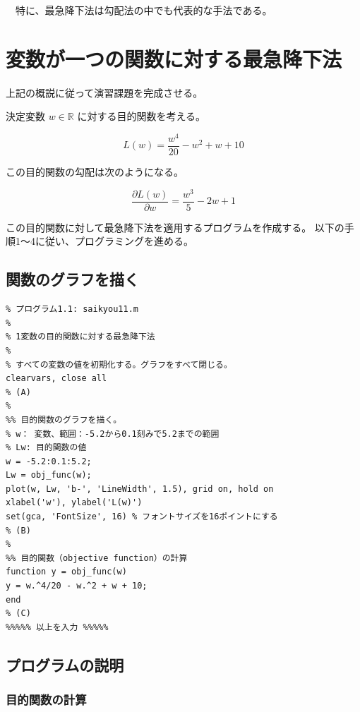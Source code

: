 \documentclass[10pt,a4paper,titlepage]{jreport} %
\begin{document}
　特に、最急降下法は勾配法の中でも代表的な手法である。

\section{変数が一つの関数に対する最急降下法}

上記の概説に従って演習課題を完成させる。

決定変数 $w \in \mathbb{R}$ に対する目的関数を考える。

\begin{equation}
L(w) = \frac{w^4}{20} - w^2 + w + 10
\end{equation}

この目的関数の勾配は次のようになる。

\begin{equation}
\frac{\partial L(w)}{\partial w} = \frac{w^3}{5} - 2w + 1
\end{equation}

この目的関数に対して最急降下法を適用するプログラムを作成する。
以下の手順1～4に従い、プログラミングを進める。

\subsection{関数のグラフを描く}

\begin{lstlisting}[caption=saikyu11]
%%%%% 以下を入力 %%%%%
% プログラム1.1: saikyou11.m
%
% 1変数の目的関数に対する最急降下法
%
% すべての変数の値を初期化する。グラフをすべて閉じる。
clearvars, close all
% (A)
% 
%% 目的関数のグラフを描く。
% w： 変数、範囲：-5.2から0.1刻みで5.2までの範囲
% Lw: 目的関数の値
w = -5.2:0.1:5.2;
Lw = obj_func(w);
plot(w, Lw, 'b-', 'LineWidth', 1.5), grid on, hold on
xlabel('w'), ylabel('L(w)')
set(gca, 'FontSize', 16) % フォントサイズを16ポイントにする
% (B)
%
%% 目的関数（objective function）の計算
function y = obj_func(w)
y = w.^4/20 - w.^2 + w + 10;
end
% (C)
%%%%% 以上を入力 %%%%%
\end{lstlisting}

\subsection{プログラムの説明}

\subsubsection{目的関数の計算}
\end{document}
